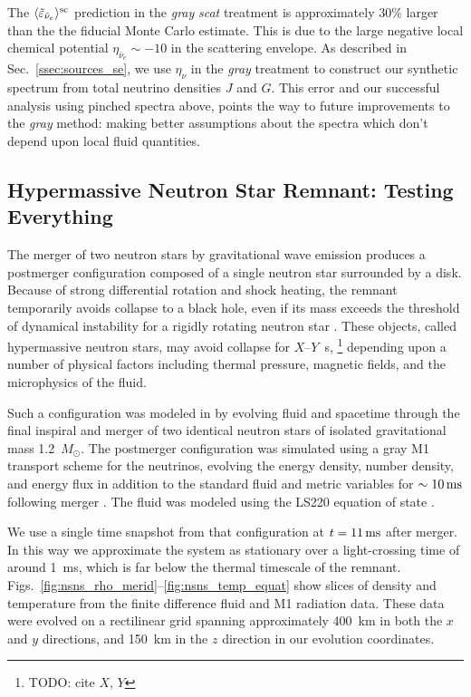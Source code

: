 \documentclass[aps,floatfix,prd,superscriptaddress,twocolumn]{revtex4-1}
\begin{document}
The $\langle\tilde{\varepsilon}_{\bar{\nu}_e}\rangle^{\rm sc}$ prediction
in the \emph{gray} \emph{scat} treatment is approximately 30\%
larger than the the fiducial Monte Carlo estimate. This is
due to the large negative local chemical potential
$\eta_{\bar{\nu}_e}\sim-10$ in the scattering envelope.
As described in Sec.~\ref{ssec:sources_se},
we use $\eta_\nu$ in the \emph{gray} treatment to construct our
synthetic spectrum from total neutrino densities $J$ and $G$.
This error and our successful analysis using pinched spectra above,
points the way to future improvements to the \emph{gray} method:
making better assumptions about the spectra which don't depend upon
local fluid quantities.

\subsection{Hypermassive Neutron Star Remnant:
  Testing Everything}
\label{ssec:test_disk_comparison}
The merger of two neutron stars by gravitational wave emission produces a
postmerger configuration composed of a single neutron star surrounded by a disk.
Because of strong differential rotation and shock heating,
the remnant temporarily avoids
collapse to a black hole, even if its mass exceeds the threshold of dynamical
instability for a rigidly rotating neutron star \cite{duez2009-review}.
These objects, called hypermassive neutron stars,
may avoid collapse for $X\textrm{--}Y$~s,
\footnote{TODO: cite $X$, $Y$}
depending upon a number of physical factors including thermal pressure,
magnetic fields, and the microphysics of the fluid.

Such a configuration was modeled in \cite{fouc2016-m1_nsns} by
evolving fluid and spacetime through the
final inspiral and merger of two identical neutron stars of
isolated gravitational mass 1.2~$M_{\odot}$. The postmerger configuration
was simulated using a gray M1 transport scheme for the neutrinos, evolving the
energy density, number density, and energy flux in addition to the standard
fluid and metric variables for $\sim10\,{\rm ms}$ following merger
\cite{fouc2016-m1_evolve_n}.
The fluid was modeled using the LS220 equation of state \cite{latt1991-nuc_eos}.

We use a single time snapshot from that configuration
at $t=11\,{\rm ms}$ after merger.
In this way we approximate the system as stationary over a light-crossing time
of around 1~ms, which is far below the thermal timescale of the remnant.
Figs.~\ref{fig:nsns_rho_merid}--\ref{fig:nsns_temp_equat}
show slices of density and temperature from the finite difference
fluid and M1 radiation data.
These data were evolved on a rectilinear grid spanning approximately 400~km in
both the $x$ and $y$ directions, and 150~km in the $z$ direction in our
evolution coordinates.
\end{document}
